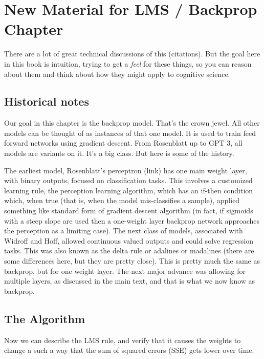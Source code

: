 \section{New Material for LMS / Backprop Chapter}

There are a lot of great technical discussions of this (citations). But the goal here in this book is intuition, trying to get a \emph{feel} for these things, so you can reason about them and think about how they might apply to cognitive science. 

\subsection{Historical notes}

Our goal in this chapter is the backprop model. That's the crown jewel. All other models can be thought of as instances of that one model. It is used to train feed forward networks using gradient descent. From Rosenblatt up to GPT 3, all models are variants on it. It's a big class. But here is some of the history.

The earliest model, Rosenblatt's perceptron (link) has one main weight layer, with binary outputs, focused on classification tasks. This involves a customized learning rule, the perception learning algorithm, which has an if-then condition which, when true (that is, when the model mis-classifies a sample), applied something like standard form of gradient descent algorithm (in fact, if sigmoids with a steep slope are used then a one-weight layer backprop network  approaches the perception as a limiting case). The next class of models, associated with Widroff and Hoff, allowed continuous valued outputs and could solve regression tasks. This was also known as the delta rule or adalines or madalines (there are some differences here, but they are pretty close). This is pretty much the same as backprop, but for one weight layer. The next major advance was allowing for multiple layers, as discussed in the main text, and that is what we now know as backprop. 

\subsection{The Algorithm}

Now we can describe the LMS rule, and verify that it causes the weights to change a such a way that the sum of squared errors (SSE) gets lower over time.

